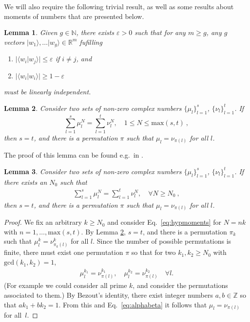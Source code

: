 \documentclass[pra,a4paper,notitlepage,nofootinbib,superscriptaddress]{revtex4-1}
\theoremstyle{plain}
\newtheorem{lemma}{Lemma}
\renewcommand{\epsilon}{\varepsilon}
\newcommand{\N}{\mathbb{N}}
\newcommand{\1}{{\openone}}
\newcommand{\be}{\begin{eqnarray}}
\newcommand{\ee}{\end{eqnarray}}
\newcommand{\ra}{\rangle}
\newcommand{\la}{\langle}
\begin{document}
We will also require the following trivial result, as well as some results about moments of numbers that are presented below.

\begin{lemma}\label{Lem1t}
    \label{Lem1}
    Given $g\in \N$, there exists $\epsilon>0$ such that for any $m\ge g$, any $g$ vectors $|w_1\ra,\ldots |w_g\ra\in \mathbb{R}^m$ fufilling
    \begin{enumerate}
        \item $|\la w_i|w_j\ra|\le \epsilon$ if $i\not =j$, and
        \item $|\la w_i|w_i\ra| \ge 1-\epsilon$
    \end{enumerate}
    must be linearly independent.
\end{lemma}


\begin{lemma}\label{lem:moments}
    Consider two sets of non-zero complex numbers
    $\{\mu_l\}_{l=1}^s$, $\{\nu_l\}_{l=1}^t$.
    If
    $$
        \sum_{l=1}^s \mu_l^N =
        \sum_{l=1}^t \nu_l^N , \quad 1 \leq N\leq \mathrm{max}(s,t)\ ,
    $$
    then $s=t$, and there is a permutation $\pi$ such that
    $\mu_l =  \nu_{\pi(l)}$ for all $l$.
\end{lemma}

The proof of this lemma can be found e.g.\ in \cite{De15}.


\begin{lemma}\label{lem:momentsN0}
    Consider two sets of non-zero complex numbers
    $\{\mu_l\}_{l=1}^s$, $\{\nu_l\}_{l=1}^t$.
    If there exists an $N_0$ such that
    \be
        \sum_{l=1}^s \mu_l^N = \sum_{l=1}^t \nu_l^N , \quad \forall N\geq N_0  \ ,
        \label{eq:hypmoments}
    \ee
    then $s=t$, and
    there is a permutation $\pi$ such that
    $\mu_l = \nu_{\pi(l)}$ for all $l$.
\end{lemma}

\begin{proof}
    We fix an arbitrary  $k\geq N_0$ and consider Eq.\ \eqref{eq:hypmoments}
    for $N=nk$ with $n=1,\ldots, \mathrm{max}(s,t)$.
    By Lemma \ref{lem:moments}, $s=t$, and there is  a permutation $\pi_{k}$ such
    that
    $\mu^{k}_l = \nu^{k}_{\pi_{k}(l)}$ for all $l$.
    Since the number of possible permutations is finite,
    there must exist one permutation $\pi$ so that for two
    $k_1,k_2\geq N_0$ with $\textrm{gcd}(k_1,k_2) = 1$,
    \be
    \mu_l^{k_1}  =
    \nu_{\pi(l)}^{k_1} ,\quad
    \mu_{l}^{k_2} =\nu_{\pi(l)}^{k_2}\quad \forall l.
    \label{eq:alphabeta}
    \ee
    (For example we could consider all prime $k$, and consider the permutations associated to them.)
    By Bezout's identity, there exist integer numbers $a,b\in \mathbb{Z}$
    so that $a k_1 +bk_2 =1.$
    From this and Eq.\ \eqref{eq:alphabeta} it follows that $\mu_l = \nu_{\pi(l)}$ for all~$l$.
\end{proof}
\end{document}
